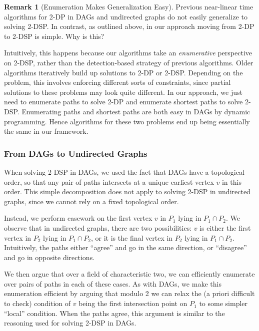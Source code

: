 \documentclass[11pt]{article}
\theoremstyle{definition}
\newtheorem{remark}[theorem]{Remark}
\begin{document}
\begin{remark}[Enumeration Makes Generalization Easy]
Previous near-linear time algorithms for \textsf{2-DP} in DAGs and undirected graphs do not easily generalize to solving \textsf{2-DSP}.
In contrast, as outlined above, in our approach moving from \textsf{2-DP} to \textsf{2-DSP} is simple.
Why is this?

Intuitively, this happens because our algorithms take an \emph{enumerative} perspective on \textsf{2-DSP}, rather than the detection-based strategy of previous algorithms.
Older algorithms iteratively build up solutions to \textsf{2-DP} or \textsf{2-DSP}. 
Depending on the problem, this involves enforcing different sorts of constraints, since partial solutions to these problems may look quite different. 
In our approach, we just need to enumerate paths to solve \textsf{2-DP} and enumerate shortest paths to solve \textsf{2-DSP}.
Enumerating paths and shortest paths are both easy in DAGs by dynamic programming.
Hence algorithms for these two problems end up being essentially the same in our framework.
\end{remark}



\subsubsection*{From DAGs to Undirected Graphs}

When solving \textsf{2-DSP} in DAGs, we used the fact that DAGs have a topological order, so that any pair of paths intersects at a unique earliest vertex $v$ in this order.
This simple decomposition does not apply to solving \textsf{2-DSP} in undirected graphs, since we cannot rely on a fixed topological order.

Instead, we perform casework on the first vertex $v$ in $P_1$ lying in $P_1\cap P_2$.
We observe that in undirected graphs, there are two possibilities: $v$ is either the first vertex in $P_2$ lying in $P_1\cap P_2$, or it is the final vertex in $P_2$ lying in $P_1\cap P_2$.
Intuitively, the paths either ``agree'' and go in the same direction, or ``disagree'' and go in opposite directions. 

We then argue that over a field of characteristic two, we can efficiently enumerate over pairs of paths in each of these cases.
As with DAGs, 
we make this enumeration efficient by arguing that modulo 2 we can relax the (a priori difficult to check) condition of $v$ being the first intersection point on $P_1$ to some simpler ``local'' condition.
When the paths agree, this argument is similar to the reasoning used for solving \textsf{2-DSP} in DAGs.
\end{document}
